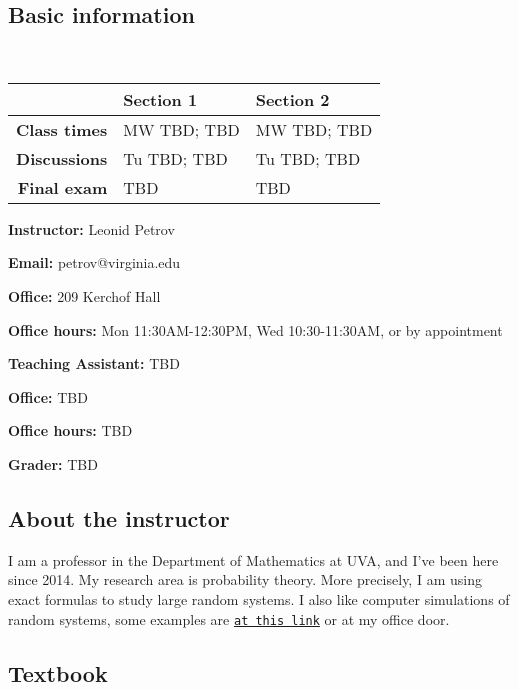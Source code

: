 \documentclass[oneside,11pt]{amsart}
\begin{document}
\subsection{Basic information}{\ }

\vspace{5pt}

\begin{tabular}{r|l|l}
	\hline
	&\textbf{Section 1} & \textbf{Section 2}
	\\\hline
	\textbf{Class times}&MW TBD; TBD & MW TBD; TBD 
	\\\hline
	\textbf{Discussions}&Tu TBD; TBD
	&
	Tu TBD; TBD
	\\\hline
	\textbf{Final exam}&
	TBD&
	TBD
	\\\hline
\end{tabular}

\vspace{10pt}

\parbox{.5\textwidth}{

\textbf{Instructor:} Leonid Petrov

\textbf{Email:} petrov@virginia.edu

\textbf{Office:} 209 Kerchof Hall

\textbf{Office hours:} Mon 11:30AM-12:30PM, Wed 10:30-11:30AM,
or by appointment}\hspace{30pt}
\parbox{.4\textwidth}{

\textbf{Teaching Assistant:} TBD

\textbf{Office:} TBD

\textbf{Office hours:} TBD

\vspace{15pt}

\textbf{Grader:} TBD}

\vspace{5pt}

\subsection{About the instructor}
I am a professor in the Department of Mathematics at UVA, and I've been here since 2014. My research area is probability theory. More precisely, I am using exact formulas to study large random systems. I also like computer simulations of random systems, some examples are \href{http://faculty.virginia.edu/petrov//blog/2015/02/20/Shapes%20with%20holes/}{\texttt{at this link}} or at my office door.

\subsection{Textbook}
\end{document}
